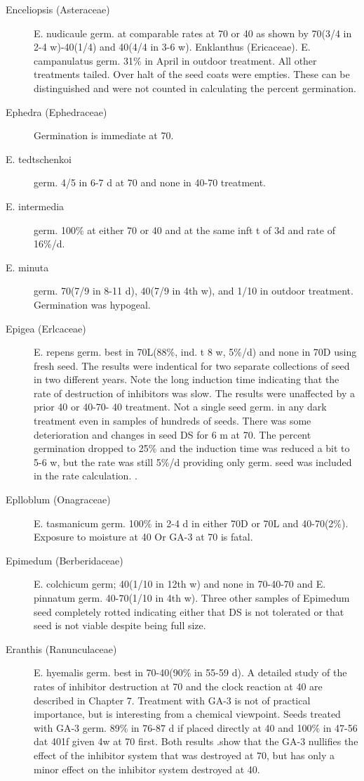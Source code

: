 \begin{description}
\item[Enceliopsis (Asteraceae)] E. nudicaule germ. at comparable rates at 70 or
40 as shown by 70(3/4 in 2-4 w)-40(1/4) and 40(4/4 in 3-6 w).
Enklanthus (Ericaceae). E. campanulatus germ. 31\% in April in outdoor
treatment. All other treatments tailed. Over halt of the seed coats were empties.
These can be distinguished and were not counted in calculating the percent
germination.

\item[Ephedra (Ephedraceae)] Germination is immediate at 70.
\item[E. tedtschenkoi] germ. 4/5 in 6-7 d at 70 and none in 40-70 treatment.
\item[E. intermedia] germ. 100\% at either 70 or 40 and at the same inft t of 3d and
rate of 16\%/d.
\item[E. minuta] germ. 70(7/9 in 8-11 d), 40(7/9 in 4th w), and 1/10 in outdoor
treatment. Germination was hypogeal.

\item[Epigea (Erlcaceae)] E. repens germ. best in 70L(88\%, ind. t 8 w, 5\%/d) and
none in 70D using fresh seed. The results were indentical for two separate collections
of seed in two different years. Note the long induction time indicating that the rate of
destruction of inhibitors was slow. The results were unaffected by a prior 40 or 40-70-
40 treatment. Not a single seed germ. in any dark treatment even in samples of
hundreds of seeds. There was some deterioration and changes in seed DS for 6 m at
70. The percent germination dropped to 25\% and the induction time was reduced a bit
to 5-6 w, but the rate was still 5\%/d providing only germ. seed was included in the rate
calculation. .
\item[Eplloblum (Onagraceae)] E. tasmanicum germ. 100\% in 2-4 d in either
70D or 70L and 40-70(2\%). Exposure to moisture at 40 Or GA-3 at 70 is fatal.

\item[Epimedum (Berberidaceae)] E. colchicum germ; 40(1/10 in 12th w) and
none in 70-40-70 and E. pinnatum germ. 40-70(1/10 in 4th w). Three other samples of
Epimedum seed completely rotted indicating either that DS is not tolerated or that
seed is not viable despite being full size.

\item[Eranthis (Ranunculaceae)] E. hyemalis germ. best in 70-40(90\% in 55-59
d). A detailed study of the rates of inhibitor destruction at 70 and the clock reaction at
40 are described in Chapter 7. Treatment with GA-3 is not of practical importance, but
is interesting from a chemical viewpoint. Seeds treated with GA-3 germ. 89\% in 76-87
d if placed directly at 40 and 100\% in 47-56 dat 401f given 4w at 70 first. Both results
.show that the GA-3 nullifies the effect of the inhibitor system that was destroyed at 70,
but has only a minor effect on the inhibitor system destroyed at 40.


\end{description}
